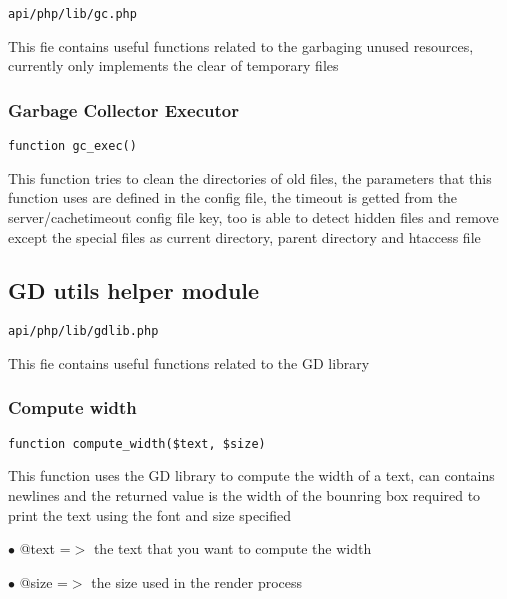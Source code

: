 \documentclass[a4paper]{article}
\begin{document}
\begin{lstlisting}
api/php/lib/gc.php
\end{lstlisting}

This fie contains useful functions related to the garbaging unused resources, currently only
implements the clear of temporary files

\hypertarget{toc452}{}
\subsubsection{Garbage Collector Executor}

\begin{lstlisting}
function gc_exec()
\end{lstlisting}

This function tries to clean the directories of old files, the parameters
that this function uses are defined in the config file, the timeout is
getted from the server/cachetimeout config file key, too is able to detect
hidden files and remove except the special files as current directory,
parent directory and htaccess file

\hypertarget{toc453}{}
\subsection{GD utils helper module}

\begin{lstlisting}
api/php/lib/gdlib.php
\end{lstlisting}

This fie contains useful functions related to the GD library

\hypertarget{toc454}{}
\subsubsection{Compute width}

\begin{lstlisting}
function compute_width($text, $size)
\end{lstlisting}

This function uses the GD library to compute the width of a text,
can contains newlines and the returned value is the width of the
bounring box required to print the text using the font and size
specified

\begin{compactitem}
\item[\color{myblue}$\bullet$] @text =$>$ the text that you want to compute the width
\item[\color{myblue}$\bullet$] @size =$>$ the size used in the render process
\end{compactitem}
\end{document}
